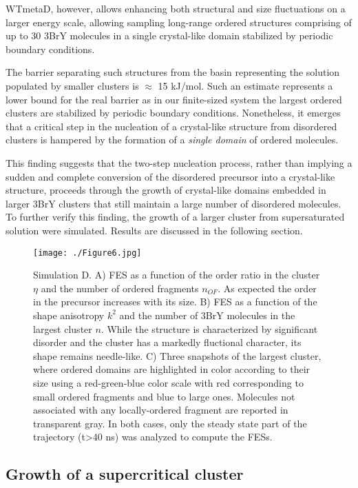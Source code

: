 \documentclass[journal=cgdefu,manuscript=article,layout=twocolumn]{achemso}
\begin{document}
WTmetaD, however, allows enhancing both structural and size fluctuations on a larger energy scale, allowing sampling long-range ordered structures comprising of up to 30 3BrY molecules in a single crystal-like domain stabilized by periodic boundary conditions.  

The barrier separating such structures from the basin representing the solution populated by smaller clusters is  $\approx$ 15 kJ/mol. Such an estimate represents a lower bound for the real barrier as in our finite-sized system the largest ordered clusters are stabilized by periodic boundary conditions.
Nonetheless, it emerges that a critical step in the nucleation of a crystal-like structure from disordered clusters is hampered by the formation of a \emph{single domain} of ordered molecules. 

This finding suggests that the two-step nucleation process, rather than implying a sudden and complete conversion of the disordered precursor into a crystal-like structure, proceeds through the growth of crystal-like domains embedded in larger 3BrY clusters that still maintain a large number of disordered molecules.
To further verify this finding, the growth of a larger cluster from supersaturated solution were simulated. Results are discussed in the following section.


\begin{figure*}[ht!]
\centering
\texttt{[image: ./Figure6.jpg]}
\caption{Simulation D. A) FES as a function of the order ratio in the cluster $\eta$ and the number of ordered fragments $n_{OF}$. As expected the order in the precursor increases with its size. B) FES as a function of the shape anisotropy $k^2$ and the number of 3BrY molecules in the largest cluster $n$. While the structure is characterized by significant disorder and the cluster has a markedly fluctional character, its shape remains needle-like. C) Three snapshots of the largest cluster, where ordered domains are highlighted in color according to their size using a red-green-blue color scale with red corresponding to small ordered fragments and blue to large ones. Molecules not associated with any locally-ordered fragment are reported in transparent gray. In both cases, only the steady state part of the trajectory (t>40 ns) was analyzed to compute the FESs.}
\label{fig:shapeanysotropy}
\end{figure*}  

\subsection{Growth of a supercritical cluster}
\end{document}
